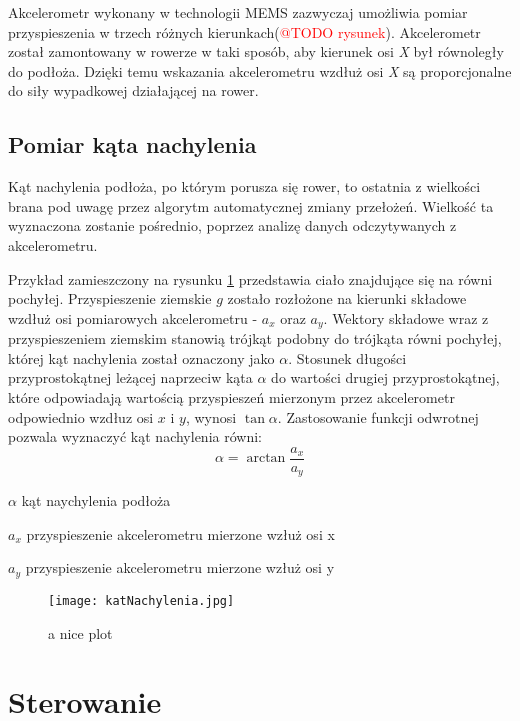 Akcelerometr wykonany w technologii MEMS zazwyczaj umożliwia pomiar przyspieszenia w trzech różnych kierunkach(\textcolor{red}{@TODO rysunek}). Akcelerometr został zamontowany w rowerze w taki sposób, aby kierunek osi \textit{X} był równoległy do podłoża. Dzięki temu wskazania akcelerometru wzdłuż osi \textit{X} są proporcjonalne do siły wypadkowej działającej na rower.

\subsection{Pomiar kąta nachylenia}
Kąt nachylenia podłoża, po którym porusza się rower, to ostatnia z wielkości  brana pod uwagę przez algorytm automatycznej zmiany przełożeń. Wielkość ta wyznaczona zostanie pośrednio, poprzez analizę danych odczytywanych z akcelerometru. 

Przykład zamieszczony na rysunku \ref{fig:równia} przedstawia ciało znajdujące się na równi pochyłej. Przyspieszenie ziemskie \textit{$g$} zostało rozłożone na kierunki składowe wzdłuż osi pomiarowych akcelerometru - \textit{$a_x$} oraz \textit{$a_y$}. Wektory składowe wraz z przyspieszeniem ziemskim stanowią trójkąt podobny do trójkąta równi pochyłej, której kąt nachylenia został oznaczony jako $\alpha$. Stosunek długości przyprostokątnej leżącej naprzeciw kąta $\alpha$ do wartości drugiej przyprostokątnej, które odpowiadają wartością przyspieszeń mierzonym przez akcelerometr odpowiednio wzdłuz osi $x$ i $y$, wynosi $\tan{\alpha}$. Zastosowanie funkcji odwrotnej pozwala wyznaczyć kąt nachylenia równi:
\begin{equation}
    \alpha=\arctan{\frac{a_x}{a_y}}
\end{equation}
\begin{eqwhere}[2cm]
	\item[$\alpha$] kąt naychylenia podłoża
	\item[$a_x$] przyspieszenie akcelerometru mierzone wzłuż osi x
	\item[$a_y$] przyspieszenie akcelerometru mierzone wzłuż osi y
\end{eqwhere}
\begin{figure}
    \centering
    \texttt{[image: katNachylenia.jpg]}
    \caption{a nice plot}
    \label{fig:równia}
\end{figure}
\section{Sterowanie}

